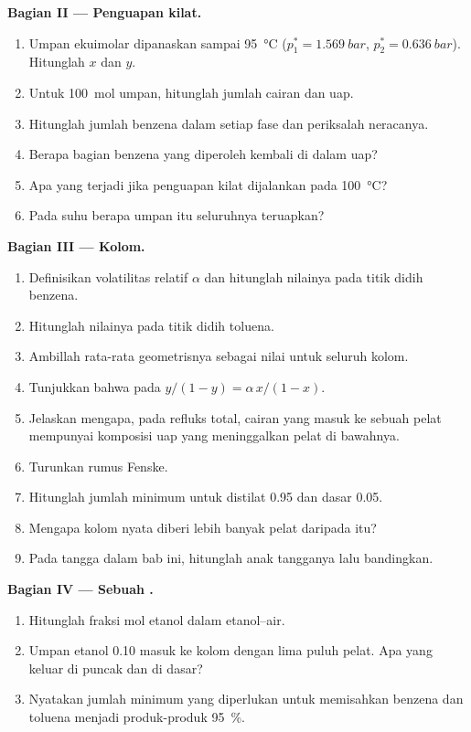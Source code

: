 \begin{problem}
\medskip
\noindent\textbf{Bagian II --- Penguapan kilat.}
\begin{enumerate}[resume]
  \item Umpan ekuimolar dipanaskan sampai \qty{95}{\degreeCelsius}
        ($p_1^* =
        \qty{1.569}{bar}$, $p_2^* = \qty{0.636}{bar}$). Hitunglah
        $x$ dan $y$.
  \item Untuk \qty{100}{mol} umpan, hitunglah jumlah cairan dan uap.
  \item Hitunglah jumlah benzena dalam setiap fase dan periksalah
        neracanya.
  \item Berapa bagian benzena yang diperoleh kembali di dalam uap?
  \item Apa yang terjadi jika penguapan kilat dijalankan pada
        \qty{100}{\degreeCelsius}?
  \item Pada suhu berapa umpan itu seluruhnya teruapkan?
\end{enumerate}

\medskip
\noindent\textbf{Bagian III --- Kolom.}
\begin{enumerate}[resume]
  \item Definisikan volatilitas relatif $\alpha$ dan hitunglah nilainya
        pada titik didih benzena.
  \item Hitunglah nilainya pada titik didih toluena.
  \item Ambillah rata-rata geometrisnya sebagai nilai untuk seluruh kolom.
  \item Tunjukkan bahwa pada  $y/(1 - y) = \alpha\,x/(1 - x)$.
  \item Jelaskan mengapa, pada refluks total, cairan yang masuk ke sebuah
        pelat mempunyai komposisi uap yang meninggalkan pelat di bawahnya.
  \item Turunkan rumus Fenske.
  \item Hitunglah jumlah minimum  untuk distilat 0.95 dan
        dasar 0.05.
  \item Mengapa kolom nyata diberi lebih banyak pelat daripada itu?
  \item Pada tangga dalam bab ini, hitunglah anak tangganya lalu
        bandingkan.
\end{enumerate}

\medskip
\noindent\textbf{Bagian IV --- Sebuah .}
\begin{enumerate}[resume]
  \item Hitunglah fraksi mol etanol dalam  etanol--air.
  \item Umpan etanol 0.10 masuk ke kolom dengan lima puluh pelat. Apa yang
        keluar di puncak dan di dasar?
  \item Nyatakan jumlah minimum  yang diperlukan untuk
        memisahkan benzena dan toluena menjadi produk-produk 95~\%.
\end{enumerate}
\end{problem}

